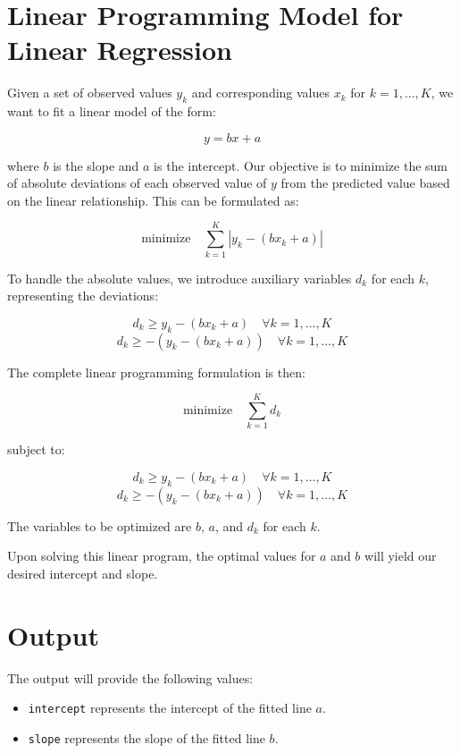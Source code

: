 \documentclass{article}
\begin{document}
\section*{Linear Programming Model for Linear Regression}

Given a set of observed values \(y_k\) and corresponding values \(x_k\) for \(k = 1, \ldots, K\), we want to fit a linear model of the form:

\[
y = bx + a
\]

where \(b\) is the slope and \(a\) is the intercept. Our objective is to minimize the sum of absolute deviations of each observed value of \(y\) from the predicted value based on the linear relationship. This can be formulated as:

\[
\text{minimize} \quad \sum_{k=1}^{K} |y_k - (bx_k + a)|
\]

To handle the absolute values, we introduce auxiliary variables \(d_k\) for each \(k\), representing the deviations:

\[
d_k \geq y_k - (bx_k + a) \quad \forall k = 1, \ldots, K
\]
\[
d_k \geq -(y_k - (bx_k + a)) \quad \forall k = 1, \ldots, K
\]

The complete linear programming formulation is then:

\[
\text{minimize} \quad \sum_{k=1}^{K} d_k
\]

subject to:

\[
d_k \geq y_k - (bx_k + a) \quad \forall k = 1, \ldots, K
\]
\[
d_k \geq -(y_k - (bx_k + a)) \quad \forall k = 1, \ldots, K
\]

The variables to be optimized are \(b\), \(a\), and \(d_k\) for each \(k\). 

Upon solving this linear program, the optimal values for \(a\) and \(b\) will yield our desired intercept and slope.

\section*{Output}

The output will provide the following values:

\begin{itemize}
    \item \texttt{intercept} represents the intercept of the fitted line \(a\).
    \item \texttt{slope} represents the slope of the fitted line \(b\).
\end{itemize}
\end{document}
